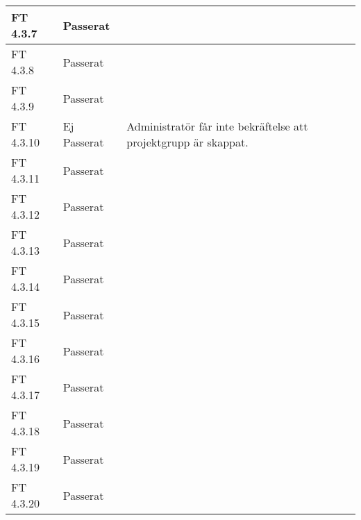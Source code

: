 \documentclass[a4paper]{article}
\begin{document}
\begin{tabular}{| l | l | p{11cm} |}
\hline
FT 4.3.7 & Passerat & \\
\hline
FT 4.3.8 & Passerat & \\
\hline
FT 4.3.9 & Passerat & \\
\hline
FT 4.3.10 & Ej Passerat & Administratör får inte bekräftelse att projektgrupp är skappat. \\
\hline
FT 4.3.11 & Passerat & \\
\hline
FT 4.3.12 & Passerat & \\
\hline
FT 4.3.13 & Passerat & \\
\hline
FT 4.3.14 & Passerat & \\
\hline
FT 4.3.15 & Passerat & \\
\hline
FT 4.3.16 & Passerat & \\
\hline
FT 4.3.17 & Passerat & \\
\hline
FT 4.3.18 & Passerat & \\
\hline
FT 4.3.19 & Passerat & \\
\hline
FT 4.3.20 & Passerat & \\
\end{tabular}
\end{document}
